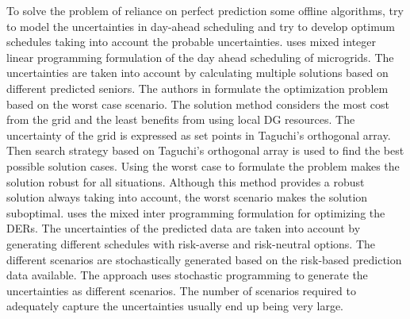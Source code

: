 To solve the problem of reliance on perfect prediction some offline algorithms, try to model the uncertainties in day-ahead scheduling and try to develop optimum schedules taking into account the probable uncertainties.
\cite{Has17} uses mixed integer linear programming formulation of the day ahead scheduling of microgrids. The uncertainties are taken into account by calculating multiple solutions based on different predicted seniors. 
The authors in \cite{Yue16} formulate the optimization problem based on the worst case scenario. The solution method considers the most cost from the grid and the least benefits from using local DG resources. The uncertainty of the grid is expressed as set points in Taguchi’s orthogonal array. Then search strategy based on Taguchi’s orthogonal array is used to find the best possible solution cases. Using the worst case to formulate the problem makes the solution robust for all situations. Although this method provides a robust solution always taking into account, the worst scenario makes the solution suboptimal.
\cite{FFa15} uses the mixed inter programming formulation for optimizing the DERs. The uncertainties of the predicted data are taken into account by generating different schedules with risk-averse and risk-neutral options. The different scenarios are stochastically generated based on the risk-based prediction data available. The approach uses stochastic programming to generate the uncertainties as different scenarios. The number of scenarios required to adequately capture the uncertainties usually end up being very large. 





